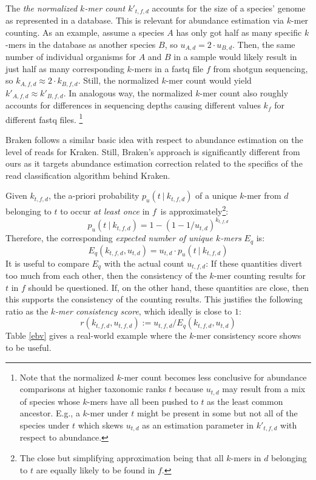 \documentclass[letterpaper,11pt,leqno]{article}
\begin{document}
The \emph{the normalized $k$-mer count $k'_{t,f,d}$} accounts for the size of a species' genome as represented in a database. This is relevant for abundance estimation via $k$-mer counting. As an example, assume a species $A$ has only got half as many specific $k$-mers in the database as another species $B$, so $u_{A,d} = 2 \cdot u_{B,d}$. Then, the same number of individual organisms for $A$ and $B$ in a sample would likely result in just half as many corresponding $k$-mers in a fastq file $f$ from shotgun sequencing, so $k_{A,f,d} \approx 2 \cdot k_{B,f,d}$. Still, the normalized $k$-mer count would yield $k'_{A,f,d} \approx k'_{B,f,d}$. 
	In analogous way, the normalized $k$-mer count also roughly accounts for differences in sequencing depths causing different values $k_{f}$ for different fastq files.
\footnote{Note that the normalized $k$-mer count becomes less conclusive for abundance comparisons at higher taxonomic ranks $t$ because $u_{t,d}$ may result from a mix of species whose $k$-mers have all been pushed to $t$ as the least common ancestor. E.g., a $k$-mer under $t$ might be present in some but not all of the species under $t$ which skews $u_{t,d}$ as an estimation parameter in $k'_{t,f,d}$ with respect to abundance.}

Braken \citep{braken} follows a similar basic idea with respect to abundance estimation on the 
level of reads for Kraken. Still, Braken's approach is significantly different from ours as it targets abundance estimation correction related to the specifics of the read classification algorithm behind Kraken.
  
Given $k_{t,f,d}$, the a-priori probability $p_u(t\ |\ k_{t,f,d})$ of a unique $k$-mer from $d$ belonging to $t$ to occur \emph{at least once} in $f$\ is approximately\footnote{The close but simplifying approximation being that all $k$-mers in $d$ belonging to $t$ are equally likely to be found in $f$.}:
\[ p_u(t\ |\ k_{t,f,d}) = 1 - (1 - 1/u_{t,d})^{k_{t,f,d}}\]
Therefore, the corresponding \emph{expected number of unique $k$-mers} $E_q$ is:
\[ E_q(k_{t,f,d},u_{t,d}) = u_{t,d} \cdot p_u(t\ |\ k_{t,f,d})\]
It is useful to compare $E_q$ with the actual count $u_{t,f,d}$: If these quantities divert too much from each other, then the consistency of the $k$-mer counting results for $t$ in $f$ should be questioned. If, on the other hand, these quantities are close, then this supports the consistency of the counting results. This justifies the following ratio as the \emph{$k$-mer consistency score}, which ideally is close to $1$:
\[ r(k_{t,f,d}, u_{t,f,d}) := u_{t,f,d} / E_q(k_{t,f,d},u_{t,d})\]
Table \ref{ebv} gives a real-world example where the $k$-mer consistency score shows to be useful.
\end{document}
